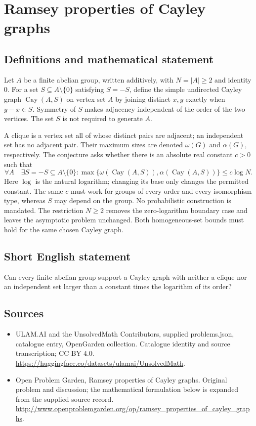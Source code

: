 \documentclass[11pt,a4paper]{article}
\begin{document}
\section*{Ramsey properties of Cayley graphs}\label{statement}

\subsection{Definitions and mathematical statement}
Let $A$ be a finite abelian group, written additively, with
$N=|A|\geq2$ and identity $0$. For a set
$S\subseteq A\setminus\{0\}$ satisfying $S=-S$, define the simple
undirected Cayley graph $\operatorname{Cay}(A,S)$ on vertex set $A$
by joining distinct $x,y$ exactly when $y-x\in S$. Symmetry of $S$
makes adjacency independent of the order of the two vertices.
The set $S$ is not required to generate $A$.

A clique is a vertex set all of whose distinct pairs are adjacent;
an independent set has no adjacent pair. Their maximum sizes are
denoted $\omega(G)$ and $\alpha(G)$, respectively. The conjecture
asks whether there is an absolute real constant $c>0$ such that
\[
 \forall A\quad\exists S=-S\subseteq A\setminus\{0\}:
 \max\{\omega(\operatorname{Cay}(A,S)),
        \alpha(\operatorname{Cay}(A,S))\}\leq c\log N.
\]
Here $\log$ is the natural logarithm; changing its base only changes
the permitted constant. The same $c$ must work for groups of every
order and every isomorphism type, whereas $S$ may depend on the
group. No probabilistic construction is mandated. The restriction
$N\geq2$ removes the zero-logarithm boundary case and leaves the
asymptotic problem unchanged. Both homogeneous-set bounds must hold
for the same chosen Cayley graph.
\subsection{Short English statement}
Can every finite abelian group support a Cayley graph with neither a clique nor an independent set larger than a constant times the logarithm of its order?
\subsection{Sources}
\begin{itemize}
\item[S1] ULAM.AI and the UnsolvedMath Contributors, supplied problems.json, catalogue entry, OpenGarden collection. Catalogue identity and source transcription; CC BY 4.0.
\url{https://huggingface.co/datasets/ulamai/UnsolvedMath}.
\item[S2] Open Problem Garden, Ramsey properties of Cayley graphs. Original problem and discussion; the mathematical formulation below is expanded from the supplied source record.
\url{http://www.openproblemgarden.org/op/ramsey_properties_of_cayley_graphs}.
\end{itemize}
\end{document}
